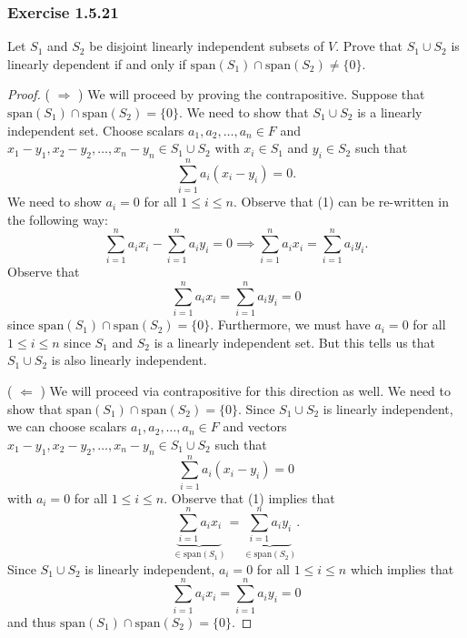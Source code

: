 \subsubsection{Exercise 1.5.21} Let \( S_{1}  \) and \( S_{2}  \) be disjoint linearly independent subsets of \( V  \). Prove that \( S_{1} \cup S_{2}  \) is linearly dependent if and only if \( \text{span}(S_{1}) \cap  \text{span}(S_{2} ) \neq \{ 0  \}  \).
\begin{proof}
    ( \( \Rightarrow \) ) We will proceed by proving the contrapositive. Suppose that \( \text{span}(S_{1}) \cap \text{span}(S_{2}) = \{ 0  \}  \). We need to show that \( S_{1} \cup S_{2} \) is a linearly independent set. Choose scalars \( a_{1}, a_{2}, \dots, a_{n} \in F  \) and \( x_{1} - y_{1}, x_{2} - y_{2}, \dots, x_{n} - y_{n} \in S_{1} \cup S_{2}  \) with \( x_{i} \in S_{1} \) and \( y_{i} \in S_{2} \) such that  
    \[ \sum_{ i= 1  }^{ n } a_{i} (x_{i} - y_{i}) = 0. \tag{1}  \]
    We need to show  \( a_{i} = 0  \) for all \( 1 \leq i \leq n  \).  Observe that (1) can be re-written in the following way:
    \[  \sum_{ i=1  }^{ n  } a_{i} x_{i} - \sum_{ i=1 }^{ n } a_{i} y_{i} = 0  \implies  \sum_{ i=1 }^{ n } a_{i} x_{i} = \sum_{ i=1 }^{ n } a_{i} y_{i}.  \]
    Observe that 
    \[ \sum_{ i=1  }^{ n  } a_{i} x_{i} = \sum_{ i=1 }^{ n } a_{i} y_{i} = 0  \] since \( \text{span}(S_{1}) \cap \text{span}(S_{2}) = \{  0 \}  \). Furthermore, we must have \( a_{i} = 0   \) for all \( 1 \leq i \leq n  \) since \( S_{1}  \) and \( S_{2}  \) is a linearly independent set. But this tells us that \( S_{1} \cup S_{2}  \) is also linearly independent.

    ( \( \Leftarrow  \) ) We will proceed via contrapositive for this direction as well. We need to show that \( \text{span}(S_{1} ) \cap \text{span}(S_{2}) = \{ 0  \}  \). Since \( S_{1} \cup S_{2}  \) is linearly independent, we can choose scalars \( a_{1}, a_{2}, \dots, a_{n} \in F  \) and vectors \( x_{1} - y_{1}, x_{2} - y_{2}, \dots, x_{n} - y_{n} \in S_{1} \cup S_{2}  \) such that 
    \[  \sum_{ i=1 }^{ n } a_{i} (x_{i} - y_{i}) = 0 \tag{1}  \]
    with \( a_{i} = 0  \) for all \( 1 \leq i \leq n \). Observe that (1) implies that 
    \[  \underbrace{\sum_{ i=1 }^{ n } a_{i} x_{i}}_{\in \text{span}(S_{1})} = \underbrace{\sum_{ i=1 }^{ n } a_{i} y_{i}}_{\in \text{span}(S_{2})}. \] Since \( S_{1} \cup S_{2}  \) is linearly independent, \( a_{i} = 0  \) for all \( 1 \leq i \leq n  \) which implies that 
    \[  \sum_{ i=1 }^{ n } a_{i} x_{i} = \sum_{ i=1 }^{ n } a_{i} y_{i} = 0 \]
    and thus \( \text{span}(S_{1}) \cap \text{span}(S_{2}) = \{ 0 \}. \)
    
\end{proof}
